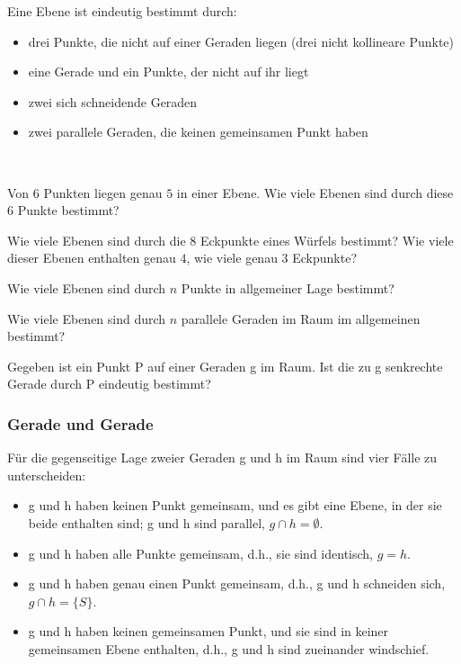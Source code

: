 \documentclass[%
11pt,%
twoside,%
titlepage,%
a4page,%
german,%
headsepline%
]{scrartcl}
\begin{document}
\noindent Eine Ebene ist eindeutig bestimmt durch:
\begin{itemize}
\item drei Punkte, die nicht auf einer Geraden liegen (drei nicht kollineare Punkte)
\item eine Gerade und ein Punkte, der nicht auf ihr liegt
\item zwei sich schneidende Geraden
\item zwei parallele Geraden, die keinen gemeinsamen Punkt haben
\end{itemize}

\begin{ueb} \ \\[-4ex]
\begin{enumeratea}
\item Von $6$ Punkten liegen genau $5$ in einer Ebene. Wie viele Ebenen sind durch diese $6$ Punkte bestimmt?
\item Wie viele Ebenen sind durch die $8$ Eckpunkte eines W\"urfels bestimmt? Wie viele dieser Ebenen enthalten genau $4$, wie viele genau $3$ Eckpunkte?
\item Wie viele Ebenen sind durch $n$ Punkte in allgemeiner Lage bestimmt?
\item Wie viele Ebenen sind durch $n$ parallele Geraden im Raum im allgemeinen bestimmt?
\end{enumeratea}
\end{ueb}

\begin{ueb}
Gegeben ist ein Punkt P auf einer Geraden g im Raum. Ist die zu g senkrechte Gerade durch P eindeutig bestimmt?
\end{ueb}

\subsubsection{Gerade und Gerade}
F\"ur die gegenseitige Lage zweier Geraden g und h im Raum sind vier F\"alle zu unterscheiden:
\begin{itemize}
\item g und h haben keinen Punkt gemeinsam, und es gibt eine Ebene, in der sie beide enthalten sind; g und h sind parallel, $g\cap h=\emptyset$.
\item g und h haben alle Punkte gemeinsam, d.h., sie sind identisch, $g=h$.
\item g und h haben genau einen Punkt gemeinsam, d.h., g und h schneiden sich, $g\cap h=\{S\}$.
\item g und h haben keinen gemeinsamen Punkt, und sie sind in keiner gemeinsamen Ebene enthalten, d.h., g und h sind zueinander windschief.
\end{itemize}
\end{document}
